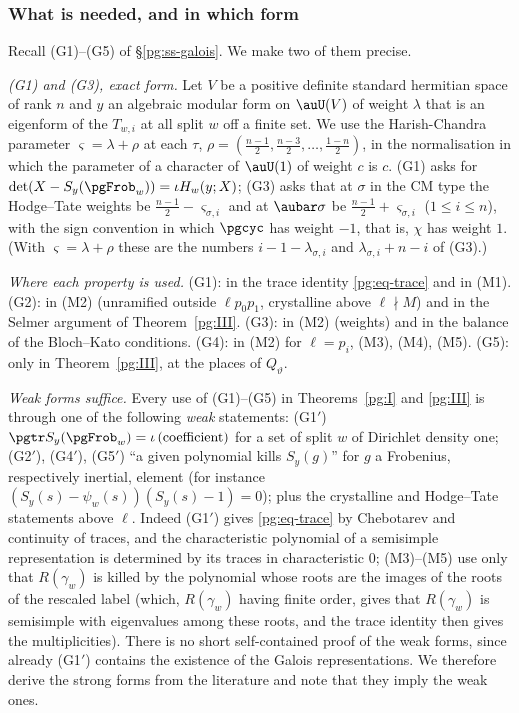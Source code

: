 \documentclass[10pt]{amsart}
\theoremstyle{definition}
\theoremstyle{remark}
\begin{document}
\subsubsection{What is needed, and in which form}\label{pga:ss-need}

Recall (G1)--(G5) of \S\ref{pg:ss-galois}. We make two of them precise.

\emph{(G1) and (G3), exact form.} Let $V$ be a positive definite standard hermitian space of rank
$n$ and $y$ an algebraic modular form on $\auU(V)$ of weight $\lambda$ that is an eigenform of the
$T_{w,i}$ at all split $w$ off a finite set. We use the Harish-Chandra parameter
$\varsigma=\lambda+\rho$ at each $\tau$, $\rho=(\frac{n-1}2,\frac{n-3}2,\dots,\frac{1-n}2)$, in the
normalisation in which the parameter of a character of $\auU(1)$ of weight $c$ is $c$. (G1) asks
for $\det(X-S_y(\pgFrob_w))=\iota H_w(y;X)$; (G3) asks that at $\sigma$ in the CM type the
Hodge--Tate weights be $\frac{n-1}2-\varsigma_{\sigma,i}$ and at $\aubar\sigma$ be
$\frac{n-1}2+\varsigma_{\sigma,i}$ ($1\le i\le n$), with the sign convention in which $\pgcyc$ has
weight $-1$, that is, $\chi$ has weight $1$. (With $\varsigma=\lambda+\rho$ these are the numbers
$i-1-\lambda_{\sigma,i}$ and $\lambda_{\sigma,i}+n-i$ of (G3).)

\emph{Where each property is used.} (G1): in the trace identity \eqref{pg:eq-trace} and in (M1).
(G2): in (M2) (unramified outside $\ell p_0p_1$, crystalline above $\ell\nmid M$) and in the
Selmer argument of Theorem~\ref{pg:III}. (G3): in (M2) (weights) and in the balance of the
Bloch--Kato conditions. (G4): in (M2) for $\ell=p_i$, (M3), (M4), (M5). (G5): only in
Theorem~\ref{pg:III}, at the places of $Q_\vartheta$.

\emph{Weak forms suffice.} Every use of (G1)--(G5) in Theorems~\ref{pg:I} and \ref{pg:III} is
through one of the following \emph{weak} statements: (G1$'$) $\pgtr S_y(\pgFrob_w)=\iota\,
(\text{coefficient})$ for a set of split $w$ of Dirichlet density one; (G2$'$), (G4$'$), (G5$'$)
``a given polynomial kills $S_y(g)$'' for $g$ a Frobenius, respectively inertial, element (for
instance $(S_y(s)-\psi_w(s))(S_y(s)-1)=0$); plus the crystalline and Hodge--Tate statements above
$\ell$. Indeed (G1$'$) gives \eqref{pg:eq-trace} by Chebotarev and continuity of traces, and the
characteristic polynomial of a semisimple representation is determined by its traces in
characteristic $0$; (M3)--(M5) use only that $R(\gamma_w)$ is killed by the polynomial whose roots
are the images of the roots of the rescaled label (which, $R(\gamma_w)$ having finite order, gives
that $R(\gamma_w)$ is semisimple with eigenvalues among these roots, and the trace identity then
gives the multiplicities). There is no short self-contained proof of the weak forms, since
already (G1$'$) contains the existence of the Galois representations. We therefore derive the
strong forms from the literature and note that they imply the weak ones.
\end{document}
